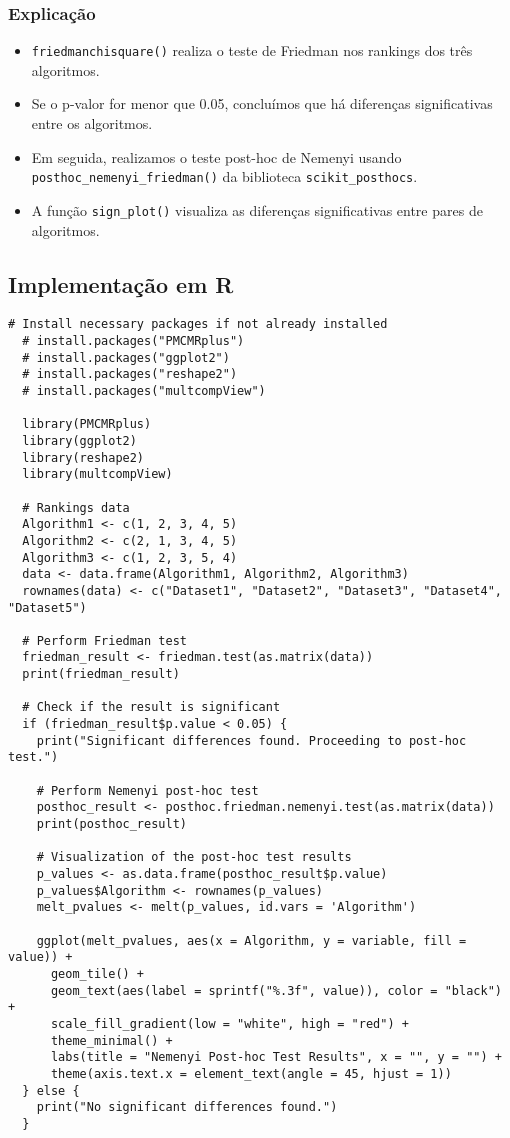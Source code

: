 \documentclass{article}
\begin{document}
\subsubsection*{Explicação}

\begin{itemize}
    \item \texttt{friedmanchisquare()} realiza o teste de Friedman nos rankings dos três algoritmos.
    \item Se o p-valor for menor que 0.05, concluímos que há diferenças significativas entre os algoritmos.
    \item Em seguida, realizamos o teste post-hoc de Nemenyi usando \texttt{posthoc\_nemenyi\_friedman()} da biblioteca \texttt{scikit\_posthocs}.
    \item A função \texttt{sign\_plot()} visualiza as diferenças significativas entre pares de algoritmos.
\end{itemize}

\subsection*{Implementação em R}

\begin{lstlisting}[style=rstyle, caption={R code for Friedman test and post-hoc analysis}]
  # Install necessary packages if not already installed
  # install.packages("PMCMRplus")
  # install.packages("ggplot2")
  # install.packages("reshape2")
  # install.packages("multcompView")
  
  library(PMCMRplus)
  library(ggplot2)
  library(reshape2)
  library(multcompView)
  
  # Rankings data
  Algorithm1 <- c(1, 2, 3, 4, 5)
  Algorithm2 <- c(2, 1, 3, 4, 5)
  Algorithm3 <- c(1, 2, 3, 5, 4)
  data <- data.frame(Algorithm1, Algorithm2, Algorithm3)
  rownames(data) <- c("Dataset1", "Dataset2", "Dataset3", "Dataset4", "Dataset5")
  
  # Perform Friedman test
  friedman_result <- friedman.test(as.matrix(data))
  print(friedman_result)
  
  # Check if the result is significant
  if (friedman_result$p.value < 0.05) {
    print("Significant differences found. Proceeding to post-hoc test.")
    
    # Perform Nemenyi post-hoc test
    posthoc_result <- posthoc.friedman.nemenyi.test(as.matrix(data))
    print(posthoc_result)
    
    # Visualization of the post-hoc test results
    p_values <- as.data.frame(posthoc_result$p.value)
    p_values$Algorithm <- rownames(p_values)
    melt_pvalues <- melt(p_values, id.vars = 'Algorithm')
  
    ggplot(melt_pvalues, aes(x = Algorithm, y = variable, fill = value)) +
      geom_tile() +
      geom_text(aes(label = sprintf("%.3f", value)), color = "black") +
      scale_fill_gradient(low = "white", high = "red") +
      theme_minimal() +
      labs(title = "Nemenyi Post-hoc Test Results", x = "", y = "") +
      theme(axis.text.x = element_text(angle = 45, hjust = 1))
  } else {
    print("No significant differences found.")
  }
  \end{lstlisting}
\end{document}
